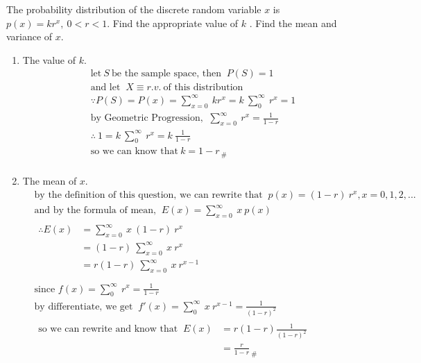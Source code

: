 The probability distribution of the discrete random variable $x$ is $p(x) = kr^x, \ 0 < r < 1$. Find the appropriate value of $k$ . Find the mean and variance of $x$.
    \begin{enumerate}
        \item The value of $k$.
            \begin{align*}
                &\text{let} \ S \ \text{be the sample space, then } \ P(S) = 1\\
                &\text{and let } \ X \equiv r.v. \ \text{of this distribution}\\
                &\because P(S) = P(x) 
                = \sum_{x = 0}^{\infty} \ kr^x 
                = k \ \sum_{0}^{\infty} \ r^x
                = 1\\
                &\text{by Geometric Progression, } \ \sum_{x = 0}^{\infty} \ r^x = \frac{1}{1 - r}\\
                &\therefore \ 1 = k \ \sum_{0}^{\infty} \ r^x 
                = k \ \frac{1}{1 - r}\\
                &\text{so we can know that} \ k = 1 - r_{ \ \#}\\
            \end{align*}

        \item The mean of $x$.
            \begin{align*}
                &\text{by the definition of this question, we can rewrite that } \ p(x) = (1-r) \ r^x, x = 0, 1, 2, ...\\
                &\text{and by the formula of mean, } \ E(x) = \sum_{x = 0}^{\infty} \ x \ p(x)\\
                &\begin{aligned}
                    \therefore E(x) &= \sum_{x = 0}^{\infty} \ x \ (1-r) \ r^x\\
                    &= (1-r) \ \sum_{x = 0}^{\infty} \ x \ r^x\\
                    &= r(1-r) \ \sum_{x = 0}^{\infty} \ x \ r^{x-1}\\
                \end{aligned}\\
                &\text{since } f(x) = \sum_{0}^{\infty} \ r^x = \frac{1}{1 - r}\\
                &\text{by differentiate, we get } \ f'(x) = \sum_{0}^{\infty} \ x \ r^{x-1} = \frac{1}{(1 - r)^2}\\       
                &\begin{aligned}
                    \text{so we can rewrite and know that } \  E(x) &= r(1-r) \frac{1}{(1-r)^2}\\
                    &= \frac{r}{1-r}_{ \ \#}\\
                \end{aligned}
            \end{align*}


\end{enumerate}
